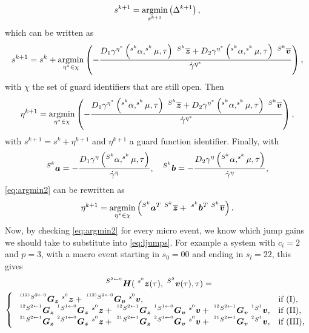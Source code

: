 \documentclass[DC2017114Bouma.tex]{subfiles}
\begin{document}
\begin{align}
s^{k+1} = \underset{s^{k+1}}{\operatorname{\text{argmin}}}\left(\Delta^{k+1}\right),
\end{align}
which can be written as
\begin{align}
s^{k+1} = s^k + \underset{\eta^*\in\chi}{\argmin}\left(-\frac{D_1\gamma^{\eta^*}\left(^{s^k}\alpha,^{s^k}\mu,\tau\right)\ ^{S^k}\overline{\zb} + D_2\gamma^{\eta^*}\left(^{s^k}\alpha,^{s^k}\mu,\tau\right)\ ^{S^k}\overline{\vb}}{\dot{\gamma}^{\eta^*}}\right),
\end{align}
with $\chi$ the set of guard identifiers that are still open. Then
\begin{align}
\eta^{k+1} = \underset{\eta^*\in\chi}{\argmin}\left(-\frac{D_1\gamma^{\eta^*}\left(^{s^k}\alpha,^{s^k}\mu,\tau\right)\ ^{S^k}\overline{\zb} + D_2\gamma^{\eta^*}\left(^{s^k}\alpha,^{s^k}\mu,\tau\right)\ ^{S^k}\overline{\vb}}{\dot{\gamma}^{\eta^*}}\right),\label{eq:argmin2}
\end{align}
with $s^{k+1} = s^k + \eta^{k+1}$ and $\eta^{k+1}$ a guard function identifier. Finally, with
\begin{align}
^{S^k}{\boldsymbol{a}} = -\frac{D_1\gamma^{\eta}\left(^{S^k}\alpha,^{s^k}\mu,\tau\right)}{\dot{\gamma}^{\eta}},
\quad
^{S^k}{\boldsymbol{b}} = -\frac{D_2\gamma^{\eta}\left(^{S^k}\alpha,^{s^k}\mu,\tau\right)}{\dot{\gamma}^{\eta}},
\end{align}
\eqref{eq:argmin2} can be rewritten as
\begin{align}
\eta^{k+1} = \underset{\eta^*\in\chi}{\argmin}\left(^{S^k}\ab^T\ ^{S^k}\overline{\zb} +\  ^{s^k}\bb^T\ ^{S^k}\overline{\vb}\right).
\end{align}
Now, by checking \eqref{eq:argmin2} for every micro event, we know which jump gains we should take to substitute into \eqref{eq:ljumps}.
For example a system with $c_i = 2$ and $p = 3$, with a macro event starting in $s_0 = 00$ and ending in $s_l = 22$, this gives 
\begin{multline}
\ ^{ S^{2\leftarrow 0}}\Hb(\ ^{s^0}\zb(\tau),\ ^{S^2}\vb(\tau),\tau) =\\ \left\lbrace\begin{array}{ll}
\ ^{^{(12)} S^{2\leftarrow 0}}\Gb_\zb\ ^{s^0}\zb + \ ^{^{(12)} S^{2\leftarrow 0}}\Gb_\vb\ ^{s^0}\vb, & \text{if }(\text{I}),\\
\ ^{^{12} S^{2\leftarrow 1}}\Gb_\zb\ ^{^{1} S^{1\leftarrow 0}}\Gb_\zb\ ^{s^0}\zb + \ ^{^{12} S^{2\leftarrow 1}}\Gb_\zb\ ^{^{1} S^{1\leftarrow 0}}\Gb_\vb\ ^{s^0}\vb + \ ^{^{12} S^{2\leftarrow 1}}\Gb_\vb\ ^{^1 S^1}\vb, & \text{if }(\text{II}),\\
\ ^{^{21} S^{2\leftarrow 1}}\Gb_\zb\ ^{^{2} S^{1\leftarrow 0}}\Gb_\zb\ ^{s^0}\zb + \ ^{^{21} S^{2\leftarrow 1}}\Gb_\zb\ ^{^{2} S^{1\leftarrow 0}}\Gb_\vb\ ^{s^0}\vb + \ ^{^{21} S^{2\leftarrow 1}}\Gb_\vb\ ^{^{2} S^1}\vb, & \text{if }(\text{III}),
\end{array}\right.\label{eq:H2200}
\end{multline}
\end{document}
